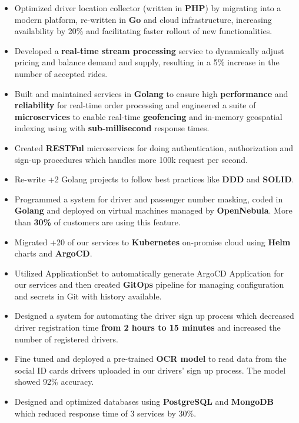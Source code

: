 \vspace{0.5cm}

\begin{itemize}
      \item Optimized driver location collector (written in \textbf{PHP}) by migrating into a modern platform, re-written in \textbf{Go} and cloud infrastructure,
            increasing availability by 20\% and facilitating faster rollout of new functionalities.
      \item Developed a \textbf{real-time stream processing} service to dynamically adjust pricing and balance demand and supply,
            resulting in a 5\% increase in the number of accepted rides.
      \item Built and maintained services in \textbf{Golang} to ensure
            high \textbf{performance} and \textbf{reliability} for real-time order processing
            and engineered a suite of \textbf{microservices} to enable real-time \textbf{geofencing} and in-memory geospatial
            indexing using  with \textbf{sub-millisecond} response times.
      \item Created \textbf{RESTFul} microservices for doing authentication, authorization and sign-up procedures which handles more 100k request per second.
      \item Re-write +2 Golang projects to follow best practices like \textbf{DDD} and \textbf{SOLID}.
      \item Programmed a system for driver and passenger number masking, coded in \textbf{Golang}
            and deployed on virtual machines managed by \textbf{OpenNebula}. More than \textbf{30\%} of customers are using this feature.
      \item Migrated +20 of our services to \textbf{Kubernetes} on-promise cloud using \textbf{Helm} charts and \textbf{ArgoCD}.
      \item Utilized  ApplicationSet to automatically generate ArgoCD Application
            for our services and then created \textbf{GitOps} pipeline for managing configuration
            and secrets in Git with history available.
      \item Designed a system for automating the driver sign up process which decreased driver registration time \textbf{from 2 hours to 15 minutes} and increased the number of registered drivers.
      \item Fine tuned and deployed a pre-trained \textbf{OCR model} to read data from the social ID cards drivers uploaded in our drivers' sign up process. The model showed 92\% accuracy.
      \item Designed and optimized databases using \textbf{PostgreSQL} and \textbf{MongoDB} which reduced response time of 3 services by 30\%.
\end{itemize}


